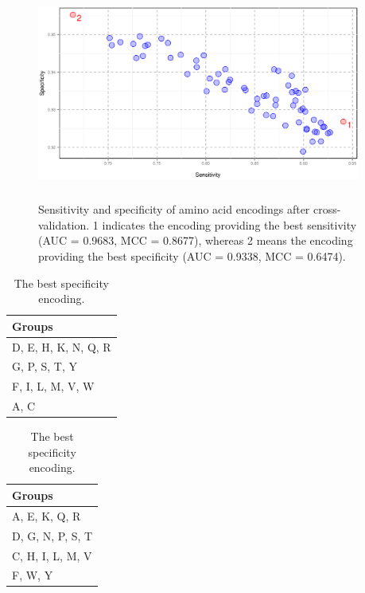 \documentclass[fleqn,10pt,twoside]{gcb15submission}
\begin{document}
\begin{figure}[ht]\centering
\includegraphics[width=0.95\textwidth, height=7cm]{figures/cvres.eps}
\caption{Sensitivity and specificity of amino acid encodings after cross-validation. 1 indicates the encoding providing the best sensitivity (AUC = 0.9683, MCC = 0.8677), whereas 2 means the encoding providing the best specificity (AUC = 0.9338, MCC = 0.6474).}
\label{fig:cvres}
\end{figure}

\begin{table}[ht]
\small
\begin{minipage}{.5\linewidth} 
\centering
\caption{The best sensitivity (final) encoding.} 
\begin{tabular}{l}
  \toprule
Groups \\ 
  \midrule
D, E, H, K, N, Q, R \\ 
   \rowcolor[gray]{0.85}G, P, S, T, Y \\ 
  F, I, L, M, V, W \\ 
   \rowcolor[gray]{0.85}A, C \\ 
   \bottomrule
\end{tabular}
\label{tab:best}
\end{minipage}
\begin{minipage}{.5\linewidth} 
\centering
\caption{The best specificity encoding.} 
\begin{tabular}{l}
  \toprule
Groups \\ 
  \midrule
A, E, K, Q, R \\ 
   \rowcolor[gray]{0.85}D, G, N, P, S, T \\ 
  C, H, I, L, M, V \\ 
   \rowcolor[gray]{0.85}F, W, Y \\ 
   \bottomrule
\end{tabular}
\label{tab:worst}
\end{minipage}
\end{table}
\end{document}
